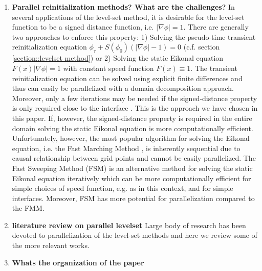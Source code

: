 \begin{enumerate}
\item \textbf{Parallel reinitialization methods? What are the challenges?}
In several applications of the level-set method, it is desirable for the level-set function to be a signed distance function, i.e. $|\nabla \phi| = 1$. There are generally two approaches to enforce this property: 1) Solving the pseudo-time transient reinitialization equation $\phi_\tau + S(\phi_0)\left(|\nabla \phi| - 1\right) = 0$ (c.f. section \ref{section::levelset method})  or 2) Solving the static Eikonal equation $F(x)|\nabla\phi| = 1$ with constant speed function $F(x) \equiv 1$. The transient reinitialization equation can be solved using explicit finite differences and thus can easily be parallelized with a domain decomposition approach. Moreover, only a few iterations may be needed if the signed-distance property is only required close to the interface . This is the approach we have chosen in this paper. If, however, the signed-distance property is required in the entire domain solving the static Eikonal equation is more computationally efficient. Unfortunately, however, the most popular algorithm for solving the Eikonal equation, i.e. the Fast Marching Method , is inherently sequential due to causal relationship between grid points and cannot be easily parallelized. The Fast Sweeping Method (FSM)  is an alternative method for solving the static Eikonal equation iteratively which can be more computationally efficient for simple choices of speed function, e.g. as in this context, and for simple interfaces. Moreover, FSM has more potential for parallelization compared to the FMM.

\item \textbf{literature review on parallel levelset}
Large body of research has been devoted to parallelization of the level-set methods and here we review some of the more relevant works.

\item \textbf{Whats the organization of the paper}
\end{enumerate}